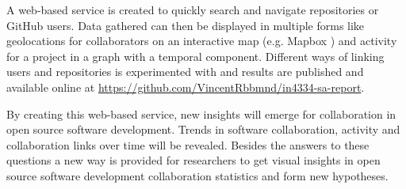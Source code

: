\documentclass[acmtog, authorversion]{acmart}
\begin{document}
A web-based service is created to quickly search and navigate repositories or GitHub users.
Data gathered can then be displayed in multiple forms like geolocations for collaborators on an interactive map (e.g. Mapbox \cite{MapBox}) and activity for a project in a graph with a temporal component.
Different ways of linking users and repositories is experimented with and results are published and available online at \url{https://github.com/VincentRbbmnd/in4334-sa-report}.

By creating this web-based service, new insights will emerge for collaboration in open source software development.
Trends in software collaboration, activity and collaboration links over time will be revealed.
Besides the answers to these questions a new way is provided for researchers to get visual insights in open source software development collaboration statistics and form new hypotheses.
\end{document}
